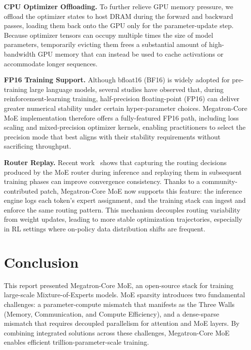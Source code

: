 \documentclass[10pt,logo,copyright]{nvidiatechreport}
\begin{document}
\textbf{CPU Optimizer Offloading.} To further relieve GPU memory pressure, we offload the optimizer states to host DRAM during the forward and backward passes, loading them back onto the GPU only for the parameter-update step. Because optimizer tensors can occupy multiple times the size of model parameters, temporarily evicting them frees a substantial amount of high-bandwidth GPU memory that can instead be used to cache activations or accommodate longer sequences.

\textbf{FP16 Training Support.} Although bfloat16 (BF16) is widely adopted for pre-training large language models, several studies have observed that, during reinforcement-learning training, half-precision floating-point (FP16) can deliver greater numerical stability under certain hyper-parameter choices. Megatron-Core MoE implementation therefore offers a fully-featured FP16 path, including loss scaling and mixed-precision optimizer kernels, enabling practitioners to select the precision mode that best aligns with their stability requirements without sacrificing throughput.

\textbf{Router Replay.} Recent work~\cite{fan2025routerreplay} shows that capturing the routing decisions produced by the MoE router during inference and replaying them in subsequent training phases can improve convergence consistency. Thanks to a community-contributed patch, Megatron-Core MoE now supports this feature: the inference engine logs each token's expert assignment, and the training stack can ingest and enforce the same routing pattern. This mechanism decouples routing variability from weight updates, leading to more stable optimization trajectories, especially in RL settings where on-policy data distribution shifts are frequent.


\section{Conclusion}
This report presented Megatron-Core MoE, an open-source stack for training large-scale Mixture-of-Experts models. MoE sparsity introduces two fundamental challenges: a parameter-compute mismatch that manifests as the Three Walls (Memory, Communication, and Compute Efficiency), and a dense-sparse mismatch that requires decoupled parallelism for attention and MoE layers. By combining integrated solutions across these challenges, Megatron-Core MoE enables efficient trillion-parameter-scale training.
\end{document}
